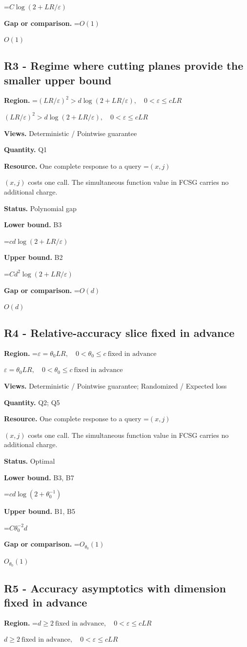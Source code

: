 \documentclass[10pt,a4paper]{article}
\newcommand{\AtlasMath}[1]{\par\begingroup\centering\setbox0=\hbox{$\displaystyle #1$}\ifdim\wd0>1.4\linewidth\typeout{ATLAS WIDE FORMULA: \the\wd0}\fi\ifdim\wd0>\linewidth\resizebox{\linewidth}{!}{\box0}\else\box0\fi\par\endgroup}
\newcommand{\AtlasInlineMath}[1]{\begingroup\setbox0=\hbox{$#1$}\ifdim\wd0>.4\linewidth\endgroup\AtlasMath{#1}\else\endgroup$#1$\fi}
\begin{document}
\AtlasMath{C\log(2+LR/\varepsilon)}
\textbf{Gap or comparison.} \AtlasInlineMath{O(1)}

\subsection{R3 - Regime where cutting planes provide the smaller upper bound}
\textbf{Region.} \AtlasInlineMath{(LR/\varepsilon)^2>d\log(2+LR/\varepsilon),\quad0<\varepsilon\le cLR}

\textbf{Views.} Deterministic / Pointwise guarantee

\textbf{Quantity.} Q1

\textbf{Resource.} One complete response to a query \AtlasInlineMath{(x,j)} costs one call. The simultaneous function value in FCSG carries no additional charge.

\textbf{Status.} Polynomial gap

\textbf{Lower bound.} B3

\AtlasMath{cd\log(2+LR/\varepsilon)}
\textbf{Upper bound.} B2

\AtlasMath{Cd^2\log(2+LR/\varepsilon)}
\textbf{Gap or comparison.} \AtlasInlineMath{O(d)}

\subsection{R4 - Relative-accuracy slice fixed in advance}
\textbf{Region.} \AtlasInlineMath{\varepsilon=\theta_0 LR,\quad0<\theta_0\le c\ \text{fixed in advance}}

\textbf{Views.} Deterministic / Pointwise guarantee; Randomized / Expected loss

\textbf{Quantity.} Q2; Q5

\textbf{Resource.} One complete response to a query \AtlasInlineMath{(x,j)} costs one call. The simultaneous function value in FCSG carries no additional charge.

\textbf{Status.} Optimal

\textbf{Lower bound.} B3, B7

\AtlasMath{c d\log(2+\theta_0^{-1})}
\textbf{Upper bound.} B1, B5

\AtlasMath{C\theta_0^{-2}d}
\textbf{Gap or comparison.} \AtlasInlineMath{O_{\theta_0}(1)}

\subsection{R5 - Accuracy asymptotics with dimension fixed in advance}
\textbf{Region.} \AtlasInlineMath{d\ge2\ \text{fixed in advance},\quad0<\varepsilon\le cLR}
\end{document}
